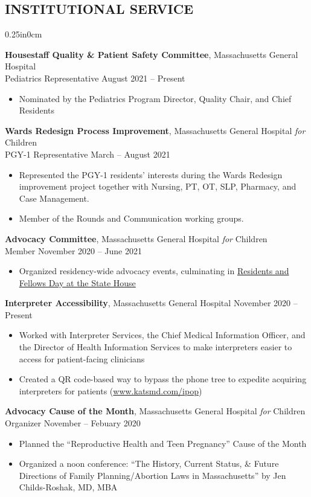 \documentclass[11pt]{article}
\newcommand{\mysec}[1]{\subsection*{\uppercase{#1}}}
\newcommand{\blockindent}{0.25in}
\newcommand{\job}[4]{
\textbf{#1}, {#2} \\
{#3} \hfill {#4}\\
}
\newcommand{\jobtitle}[2]{
{#1} \hfill {#2}\\
}
\begin{document}
\mysec{Institutional Service}
\begin{adjustwidth}{\blockindent}{0cm}

\job{Housestaff Quality \& Patient Safety Committee}{Massachusetts General Hospital}{Pediatrics Representative}{August 2021 -- Present}
\begin{itemize}
	\item Nominated by the Pediatrics Program Director, Quality Chair, and Chief Residents
\end{itemize}

\job{Wards Redesign Process Improvement}{Massachusetts General Hospital \emph{for} Children}{PGY-1 Representative}{March -- August 2021}
\begin{itemize}
	\item Represented the PGY-1 residents' interests during the Wards Redesign improvement project together with Nursing, PT, OT, SLP, Pharmacy, and Case Management.
	\item Member of the Rounds and Communication working groups.
\end{itemize}

\job{Advocacy Committee}{Massachusetts General Hospital \emph{for} Children}{Member}{November 2020 -- June 2021}
\begin{itemize}
	\item Organized residency-wide advocacy events, culminating in \href{https://rfdash.weebly.com/}{Residents and Fellows Day at the State House}
\end{itemize}

\jobtitle{\textbf{Interpreter Accessibility}, Massachusetts General Hospital}{November 2020 -- Present}
\begin{itemize}
	\item Worked with Interpreter Services, the Chief Medical Information Officer, and the Director of Health Information Services to make interpreters easier to access for patient-facing clinicians
	\item Created a QR code-based way to bypass the phone tree to expedite acquiring interpreters for patients (\href{https://www.katsmd.com/ipop}{www.katsmd.com/ipop})
\end{itemize}

\job{Advocacy Cause of the Month}{Massachusetts General Hospital \emph{for} Children}{Organizer}{November -- Febuary 2020}
\begin{itemize}
	\item Planned the ``Reproductive Health and Teen Pregnancy'' Cause of the Month
	\item Organized a noon conference: ``The History, Current Status, \& Future Directions of Family Planning/Abortion Laws in Massachusetts'' by Jen Childs-Roshak, MD, MBA
\end{itemize}


\end{adjustwidth}
\end{document}
